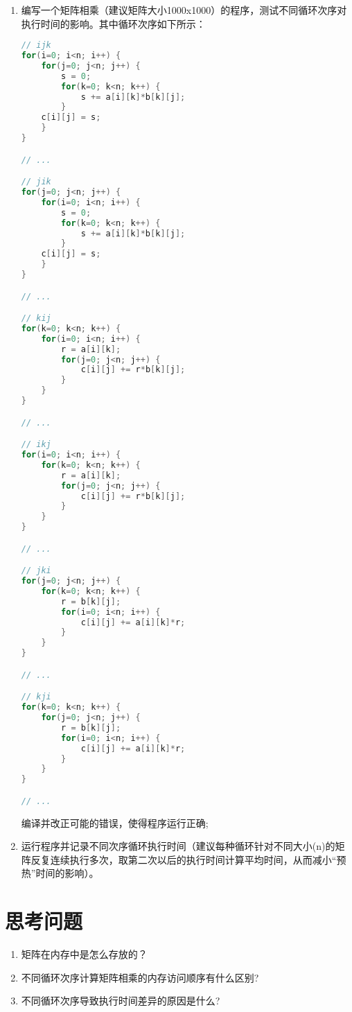 \begin{enumerate}
	\item 编写一个矩阵相乘（建议矩阵大小1000x1000）的程序，测试不同循环次序对执行时间的影响。其中循环次序如下所示：
\begin{lstlisting}[language={C++}]
// ijk
for(i=0; i<n; i++) {
    for(j=0; j<n; j++) {
        s = 0;
        for(k=0; k<n; k++) {
            s += a[i][k]*b[k][j];
        }
	c[i][j] = s;
    }
}

// ...

// jik
for(j=0; j<n; j++) {
    for(i=0; i<n; i++) {
        s = 0;
        for(k=0; k<n; k++) {
            s += a[i][k]*b[k][j];
        }
	c[i][j] = s;
    }
}

// ...

// kij
for(k=0; k<n; k++) {
    for(i=0; i<n; i++) {
        r = a[i][k];
        for(j=0; j<n; j++) {
            c[i][j] += r*b[k][j];
        }
    }
}

// ...

// ikj
for(i=0; i<n; i++) {
    for(k=0; k<n; k++) {
        r = a[i][k];
        for(j=0; j<n; j++) {
            c[i][j] += r*b[k][j];
        }
    }
}

// ...

// jki
for(j=0; j<n; j++) {
    for(k=0; k<n; k++) {
        r = b[k][j];
        for(i=0; i<n; i++) {
            c[i][j] += a[i][k]*r;
        }
    }
}

// ...

// kji
for(k=0; k<n; k++) {
    for(j=0; j<n; j++) {
        r = b[k][j];
        for(i=0; i<n; i++) {
            c[i][j] += a[i][k]*r;
        }
    }
}

// ...

\end{lstlisting}

	编译并改正可能的错误，使得程序运行正确;

\item 运行程序并记录不同次序循环执行时间（建议每种循环针对不同大小(n)的矩阵反复连续执行多次，取第二次以后的执行时间计算平均时间，从而减小“预热”时间的影响）。
\end{enumerate}

\section{思考问题}

\begin{enumerate}
	\item 矩阵在内存中是怎么存放的？
	\item 不同循环次序计算矩阵相乘的内存访问顺序有什么区别?
	\item 不同循环次序导致执行时间差异的原因是什么?
\end{enumerate}

